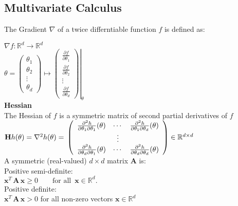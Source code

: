 \subsection*{Multivariate Calculus}
The Gradient $\nabla$ of a twice differntiable function $f$ is defined as:

$\nabla f:\mathbb {R}^ d \rightarrow \mathbb {R}^ d $\\
$\displaystyle \theta =\begin{pmatrix} \theta _1\\ \theta _2\\ \vdots \\ \theta _ d\end{pmatrix} \displaystyle \mapsto \displaystyle \left.\begin{pmatrix}  \frac{\partial f }{\partial \theta _1}\\ \frac{\partial f }{\partial \theta _2}\\ \vdots \\ \frac{\partial f }{\partial \theta _ d}\end{pmatrix}\right|_{\theta }$\\
\textbf{Hessian}\\

The Hessian of $f$ is a symmetric matrix of second partial derivatives of $f$\\

$\mathbf{H} h(\theta )= \nabla ^{2} h(\theta )= \\
\left(\begin{array}{ c c c }
\frac{\partial ^{2} h}{\partial \theta _{1} \partial \theta _{1}} (\theta ) & \cdots  & \frac{\partial ^{2} h}{\partial \theta _{1} \partial \theta _{d}} (\theta )\\
 & \vdots  & \\
\frac{\partial ^{2} h}{\partial \theta _{d} \partial \theta _{1}} (\theta ) & \cdots  & \frac{\partial ^{2} h}{\partial \theta _{d} \partial \theta _{d}} (\theta )
\end{array}\right) \in \mathbb{R}^{d\times d}$\\

A symmetric (real-valued) $d\times d$  matrix $\mathbf{A}$ is:\\

Positive semi-definite:\\
$\mathbf{x}^ T \, \mathbf{A}\, \mathbf{x} \geq 0\qquad \text {for all }\,  \mathbf{x}\in \mathbb {R}^ d.$\\

Positive definite:\\
$\mathbf{x}^ T \, \mathbf{A}\, \mathbf{x}> 0$ for all non-zero vectors $\mathbf{x}\in \mathbb {R}^ d$\\

